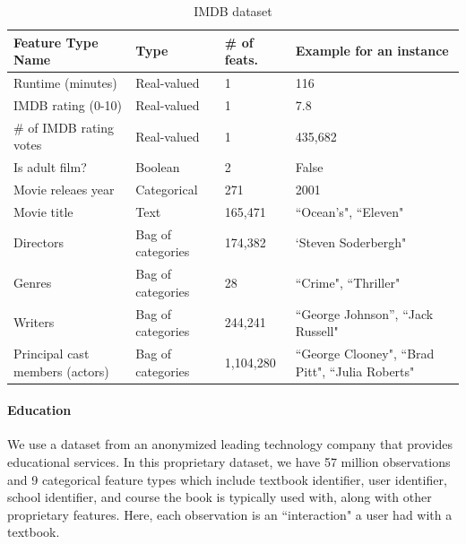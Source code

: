 \documentclass{article} %
\begin{document}
\begin{table}[htb]
\footnotesize
\centering
\caption{IMDB dataset}
\label{tab:features}
\begin{tabular}{@{}lllp{6cm}@{}}
\toprule
Feature Type Name      & Type              & \# of feats. & Example for an instance                                      \\ \midrule
Runtime (minutes)       & Real-valued       & 1                 & 116                                                           \\
IMDB rating (0-10)      & Real-valued       & 1                 & 7.8                                                          \\
\# of IMDB rating votes & Real-valued       & 1                 & 435,682                                                          \\
Is adult film?          & Boolean           & 2                 & False                                                        \\
Movie releaes year      & Categorical          & 271               & 2001                                                         \\
Movie title             & Text      & 165,471           & ``Ocean's", ``Eleven"                                  \\
Directors               & Bag of categories & 174,382           & `Steven Soderbergh"                                     \\
Genres                  & Bag of categories & 28                &``Crime", ``Thriller"                                 \\
Writers                 & Bag of categories & 244,241           &``George Johnson'', ``Jack Russell"                      \\
Principal cast members (actors) & Bag of categories & 1,104,280         & ``George Clooney", ``Brad Pitt", ``Julia Roberts" \\\bottomrule
\end{tabular}
\end{table}

\paragraph{Education}
We use a dataset from an anonymized leading technology company that provides educational services.
In this proprietary dataset, we have 57  million observations and 9 categorical feature types which include textbook identifier, user identifier, school identifier, and course the book is typically used with, along with other proprietary features.
Here, each observation is an ``interaction" a user had with a textbook.
\end{document}

